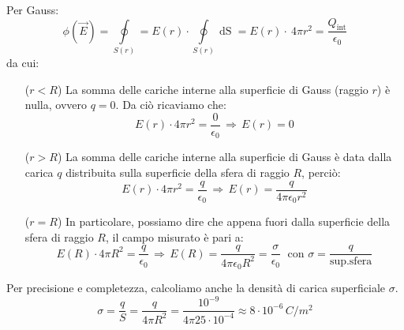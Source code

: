 \documentclass[a4paper,12pt,titlepage,openany]{book}
\theoremstyle{mydef}
\begin{document}
            Per Gauss:
            \begin{equation*}
                \phi(\vec{E}) = \oint\limits_{S(r)}=E(r)\cdot\oint\limits_{S(r)}\mathop{dS} = E(r)\cdot\ 4\pi r^2 = \frac{Q_{\text{int}}}{\epsilon_0}
            \end{equation*}
            da cui:
            \begin{itemize}
                \item[($r<R$)]{
                    La somma delle cariche interne alla superficie di Gauss (raggio $r$) è nulla, ovvero $q=0$.
                    Da ciò ricaviamo che:
                    \begin{equation*}
                        E(r)\cdot 4\pi r^2 = \frac{0}{\epsilon_0}\,\Rightarrow\,E(r) = 0
                    \end{equation*}
                }
                \item[($r>R$)]{
                    La somma delle cariche interne alla superficie di Gauss è data dalla carica $q$ distribuita sulla
                    superficie della sfera di raggio $R$, perciò:
                    \begin{equation*}
                    E(r)\cdot 4\pi r^2 = \frac{q}{\epsilon_0}\,\Rightarrow\,E(r) = \frac{q}{4\pi\epsilon_0 r^2}
                    \end{equation*}
                }
                \item[($r=R$)]{
                    In particolare, possiamo dire che appena fuori dalla superficie della sfera di raggio $R$, il campo misurato è pari a:
                    \begin{equation*}
                    E(R)\cdot 4\pi R^2 = \frac{q}{\epsilon_0}\,\Rightarrow\,E(R) = \frac{q}{4\pi\epsilon_0 R^2} = \frac{\sigma}{\epsilon_0}
                    \;\mbox{ con }\sigma=\frac{q}{\mbox{sup.sfera}}
                    \end{equation*}
                }
            \end{itemize}
            Per precisione e completezza, calcoliamo anche la densità di carica superficiale $\sigma$.
            \begin{equation*}
                \sigma=\frac{q}{S}=\frac{q}{4\pi R^2} = \frac{10^{-9}}{4\pi 25\cdot 10^{-4}} \approx 8\cdot 10^{-6}\, C/m^2
            \end{equation*}
            
\end{document}
